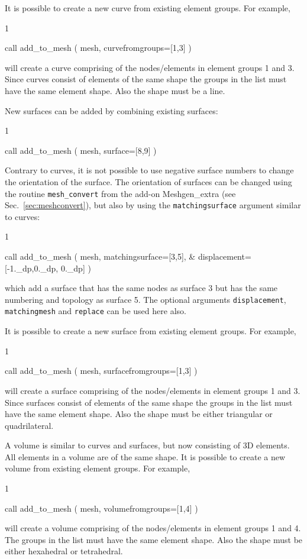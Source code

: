 It is possible to create a new curve from existing element groups. For
example,
\begin{listing}{1}

  call add_to_mesh ( mesh, curvefromgroups=[1,3] )
   
\end{listing}
will create a curve comprising of the nodes/elements in element groups
1 and 3. Since curves consist of elements of the same shape the groups in the
list must have the same element shape. Also the shape must be a line.

New surfaces can be added by combining existing surfaces:
\begin{listing}{1}

  call add_to_mesh ( mesh, surface=[8,9] )
   
\end{listing}
Contrary to curves, it is not possible to use negative surface numbers to
change the orientation of the surface. The orientation of surfaces can be
changed using the routine \texttt{mesh\_convert} from the
add-on Meshgen\_extra (see Sec.~\ref{sec:meshconvert}), but also by using the
\texttt{matchingsurface} argument similar to curves:
\begin{listing}{1}

  call add_to_mesh ( mesh, matchingsurface=[3,5], &
                                   displacement=[-1._dp,0._dp, 0._dp] )
   
\end{listing}
which add a surface that has the same nodes as surface 3
but has the same numbering and topology as surface 5. The optional arguments
\texttt{displacement}, \texttt{matchingmesh} and \texttt{replace} can be used
here also.

It is possible to create a new surface from existing element groups. For
example,
\begin{listing}{1}

  call add_to_mesh ( mesh, surfacefromgroups=[1,3] )
   
\end{listing}
will create a surface comprising of the nodes/elements in element groups
1 and 3. Since surfaces consist of elements of the same shape the groups in the
list must have the same element shape. Also the shape must be either triangular 
or quadrilateral.

A volume is similar to curves and surfaces, but now consisting of 3D elements.
All elements in a volume are of the same shape.
It is possible to create a new volume from existing element groups. For
example,
\begin{listing}{1}

  call add_to_mesh ( mesh, volumefromgroups=[1,4] )
   
\end{listing}
will create a volume comprising of the nodes/elements in element groups
1 and 4. The groups in the
list must have the same element shape. Also the shape must be either 
hexahedral or tetrahedral.

